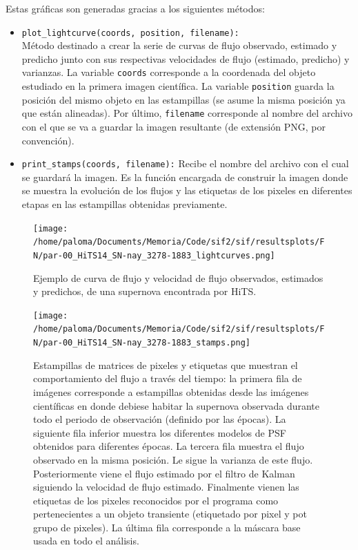 Estas gr\'aficas son generadas gracias a los siguientes m\'etodos:

\begin{itemize}
\item \texttt{plot\_lightcurve(coords, position, filename):}\\
M\'etodo destinado a crear la serie de curvas de flujo observado, estimado y predicho junto con sus respectivas velocidades de flujo (estimado, predicho) y varianzas. La variable \texttt{coords} corresponde a la coordenada del objeto estudiado en la primera imagen cient\'ifica. La variable \texttt{position} guarda la posici\'on del mismo objeto en las estampillas (se asume la misma posici\'on ya que est\'an alineadas). Por \'ultimo, \texttt{filename} corresponde al nombre del archivo con el que se va a guardar la imagen resultante (de extensi\'on PNG, por convenci\'on).  
\item \texttt{print\_stamps(coords, filename):}
Recibe el nombre del archivo con el cual se guardar\'a la imagen. Es la funci\'on encargada de construir la imagen donde se muestra la evoluci\'on de los flujos y las etiquetas de los pixeles en diferentes etapas en las estampillas obtenidas previamente.
\end{itemize}

\begin{figure}
\centering
\texttt{[image: /home/paloma/Documents/Memoria/Code/sif2/sif/resultsplots/FN/par-00\_HiTS14\_SN-nay\_3278-1883\_lightcurves.png]}
\caption{Ejemplo de curva de flujo y velocidad de flujo observados, estimados y predichos, de una supernova encontrada por HiTS. }
\label{fig:lc_result}
\end{figure}

\begin{figure}
\centering
\texttt{[image: /home/paloma/Documents/Memoria/Code/sif2/sif/resultsplots/FN/par-00\_HiTS14\_SN-nay\_3278-1883\_stamps.png]}
\caption{Estampillas de matrices de pixeles y etiquetas que muestran el comportamiento del flujo a trav\'es del tiempo: la primera fila de im\'agenes corresponde a estampillas obtenidas desde las im\'agenes cient\'ificas en donde debiese habitar la supernova observada durante todo el periodo de observaci\'on (definido por las \'epocas). La siguiente fila inferior muestra los diferentes modelos de PSF obtenidos para diferentes \'epocas. La tercera fila muestra el flujo observado en la misma posici\'on. Le sigue la varianza de este flujo. Posteriormente viene el flujo estimado por el filtro de Kalman siguiendo la velocidad de flujo estimado. Finalmente vienen las etiquetas de los pixeles reconocidos por el programa como pertenecientes a un objeto transiente (etiquetado por pixel y pot grupo de pixeles). La \'ultima fila corresponde a la m\'ascara base usada en todo el an\'alisis.}
\label{fig:lc_result}
\end{figure}
\bigskip

